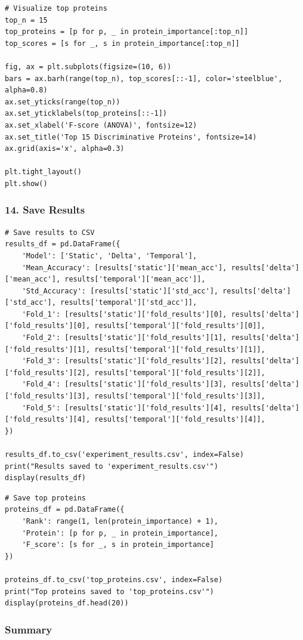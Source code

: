 \begin{lstlisting}
# Visualize top proteins
top_n = 15
top_proteins = [p for p, _ in protein_importance[:top_n]]
top_scores = [s for _, s in protein_importance[:top_n]]
 
fig, ax = plt.subplots(figsize=(10, 6))
bars = ax.barh(range(top_n), top_scores[::-1], color='steelblue', alpha=0.8)
ax.set_yticks(range(top_n))
ax.set_yticklabels(top_proteins[::-1])
ax.set_xlabel('F-score (ANOVA)', fontsize=12)
ax.set_title('Top 15 Discriminative Proteins', fontsize=14)
ax.grid(axis='x', alpha=0.3)
 
plt.tight_layout()
plt.show()
\end{lstlisting}
 
\subsubsection*{14. Save Results}
 
\begin{lstlisting}
# Save results to CSV
results_df = pd.DataFrame({
    'Model': ['Static', 'Delta', 'Temporal'],
    'Mean_Accuracy': [results['static']['mean_acc'], results['delta']['mean_acc'], results['temporal']['mean_acc']],
    'Std_Accuracy': [results['static']['std_acc'], results['delta']['std_acc'], results['temporal']['std_acc']],
    'Fold_1': [results['static']['fold_results'][0], results['delta']['fold_results'][0], results['temporal']['fold_results'][0]],
    'Fold_2': [results['static']['fold_results'][1], results['delta']['fold_results'][1], results['temporal']['fold_results'][1]],
    'Fold_3': [results['static']['fold_results'][2], results['delta']['fold_results'][2], results['temporal']['fold_results'][2]],
    'Fold_4': [results['static']['fold_results'][3], results['delta']['fold_results'][3], results['temporal']['fold_results'][3]],
    'Fold_5': [results['static']['fold_results'][4], results['delta']['fold_results'][4], results['temporal']['fold_results'][4]],
})
 
results_df.to_csv('experiment_results.csv', index=False)
print("Results saved to 'experiment_results.csv'")
display(results_df)
\end{lstlisting}
 
\begin{lstlisting}
# Save top proteins
proteins_df = pd.DataFrame({
    'Rank': range(1, len(protein_importance) + 1),
    'Protein': [p for p, _ in protein_importance],
    'F_score': [s for _, s in protein_importance]
})
 
proteins_df.to_csv('top_proteins.csv', index=False)
print("Top proteins saved to 'top_proteins.csv'")
display(proteins_df.head(20))
\end{lstlisting}
 
\subsubsection*{Summary}
 
